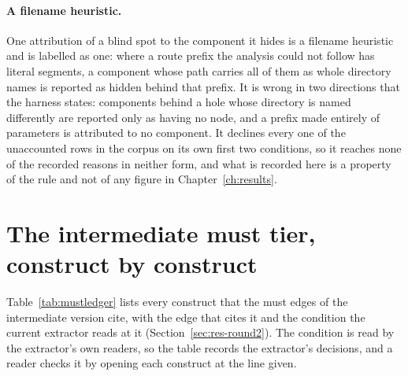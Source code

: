 \paragraph{A filename heuristic.} One attribution of a blind spot to the component it hides is a filename heuristic and is labelled as one: where a route prefix the analysis could not follow has literal segments, a component whose path carries all of them as whole directory names is reported as hidden behind that prefix. It is wrong in two directions that the harness states: components behind a hole whose directory is named differently are reported only as having no node, and a prefix made entirely of parameters is attributed to no component. It declines every one of the \RoundTwoUnexplained{} unaccounted rows in the corpus on its own first two conditions, so it reaches none of the recorded reasons in neither form, and what is recorded here is a property of the rule and not of any figure in Chapter~\ref{ch:results}.

\section{The intermediate must tier, construct by construct}
\label{app:mustledger}

Table~\ref{tab:mustledger} lists every construct that the \MustCtxEdges{} must edges of the intermediate version cite, with the edge that cites it and the condition the current extractor reads at it (Section~\ref{sec:res-round2}). The condition is read by the extractor's own readers, so the table records the extractor's decisions, and a reader checks it by opening each construct at the line given.

